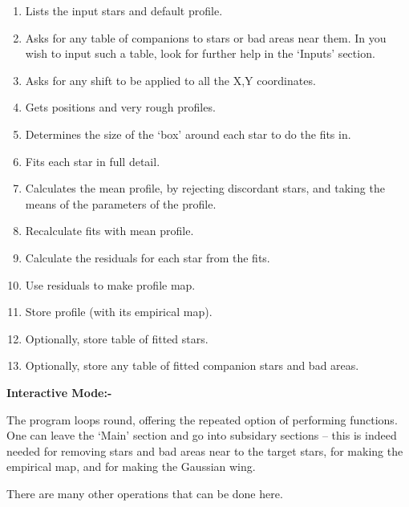 \begin{small}
{{\begin{enumerate}
\item  Lists the input stars and default profile.
 
\item  Asks for any table of companions to stars or bad areas near them.
       In you wish to input such a table, look for further help in
       the `Inputs' section.
 
\item  Asks for any shift to be applied to all the X,Y coordinates.
 
\item  Gets positions and very rough profiles.
 
\item  Determines the size of the `box' around each star to do the
       fits in.
 
\item  Fits each star in full detail.
 
\item  Calculates the mean profile, by rejecting discordant stars, and
       taking the means of the parameters of the profile.
 
\item  Recalculate fits with mean profile.
 
\item  Calculate the residuals for each star from the fits.
 
\item  Use residuals to make profile map.
 
\item  Store profile (with its empirical map).
 
\item  Optionally, store table of fitted stars.
 
\item  Optionally, store any table of fitted companion stars and bad areas.
 
\end{enumerate}
 
 
 {\bf \hspace*{2em} Interactive Mode:-}
 
 The program loops round, offering the repeated option
 of performing functions. One can leave the `Main' section and
 go into subsidary sections -- this is indeed needed for removing
 stars and bad areas near to the target stars, for making the
 empirical map, and for making the Gaussian wing.
 
 There are many other operations that can be done here.
 
}}
\end{small}
